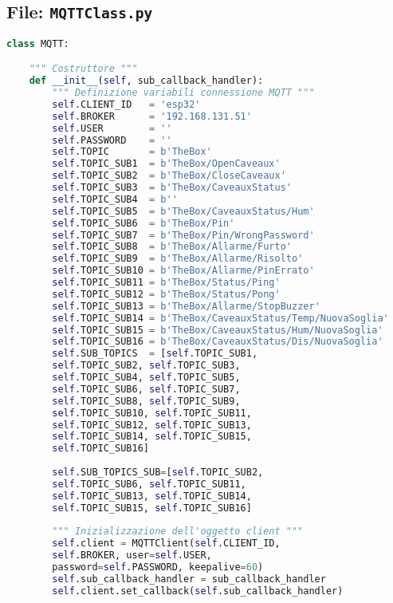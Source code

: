 \documentclass[12pt,a4paper]{article}
\begin{document}
\subsection{File: \texttt{MQTTClass.py}}
\begin{lstlisting}[language=Python, caption={Questa classe gestisce la creazione del client MQTT. Il costruttore inizializza i vari topic e altre variabili di connessione quali indirizzo ip del broken e id del client. Infine inizializza l'oggetto client impostando la funzione di callback inviata come parametro di input. Il metodo checkAndReadMsg() pubblica i valori letti dal sensore di umidità e temperatura e risolve eventuali problemi di connessione.}]	
class MQTT:

	""" Costruttore """
	def __init__(self, sub_callback_handler):
		""" Definizione variabili connessione MQTT """
		self.CLIENT_ID   = 'esp32'
		self.BROKER      = '192.168.131.51'
		self.USER        = ''
		self.PASSWORD    = ''
		self.TOPIC       = b'TheBox'
		self.TOPIC_SUB1  = b'TheBox/OpenCaveaux'
		self.TOPIC_SUB2  = b'TheBox/CloseCaveaux'
		self.TOPIC_SUB3  = b'TheBox/CaveauxStatus'
		self.TOPIC_SUB4  = b''
		self.TOPIC_SUB5  = b'TheBox/CaveauxStatus/Hum'
		self.TOPIC_SUB6  = b'TheBox/Pin'
		self.TOPIC_SUB7  = b'TheBox/Pin/WrongPassword'
		self.TOPIC_SUB8  = b'TheBox/Allarme/Furto'
		self.TOPIC_SUB9  = b'TheBox/Allarme/Risolto'
		self.TOPIC_SUB10 = b'TheBox/Allarme/PinErrato'
		self.TOPIC_SUB11 = b'TheBox/Status/Ping'
		self.TOPIC_SUB12 = b'TheBox/Status/Pong'
		self.TOPIC_SUB13 = b'TheBox/Allarme/StopBuzzer'
		self.TOPIC_SUB14 = b'TheBox/CaveauxStatus/Temp/NuovaSoglia'
		self.TOPIC_SUB15 = b'TheBox/CaveauxStatus/Hum/NuovaSoglia'
		self.TOPIC_SUB16 = b'TheBox/CaveauxStatus/Dis/NuovaSoglia'
		self.SUB_TOPICS  = [self.TOPIC_SUB1, 
		self.TOPIC_SUB2, self.TOPIC_SUB3, 
		self.TOPIC_SUB4, self.TOPIC_SUB5, 
		self.TOPIC_SUB6, self.TOPIC_SUB7, 
		self.TOPIC_SUB8, self.TOPIC_SUB9, 
		self.TOPIC_SUB10, self.TOPIC_SUB11, 
		self.TOPIC_SUB12, self.TOPIC_SUB13, 
		self.TOPIC_SUB14, self.TOPIC_SUB15, 
		self.TOPIC_SUB16]
		
		self.SUB_TOPICS_SUB=[self.TOPIC_SUB2, 
		self.TOPIC_SUB6, self.TOPIC_SUB11, 
		self.TOPIC_SUB13, self.TOPIC_SUB14, 
		self.TOPIC_SUB15, self.TOPIC_SUB16]
	
		""" Inizializzazione dell'oggetto client """
		self.client = MQTTClient(self.CLIENT_ID, 
		self.BROKER, user=self.USER, 
		password=self.PASSWORD, keepalive=60)
		self.sub_callback_handler = sub_callback_handler
		self.client.set_callback(self.sub_callback_handler)
		

\end{lstlisting}
\end{document}
